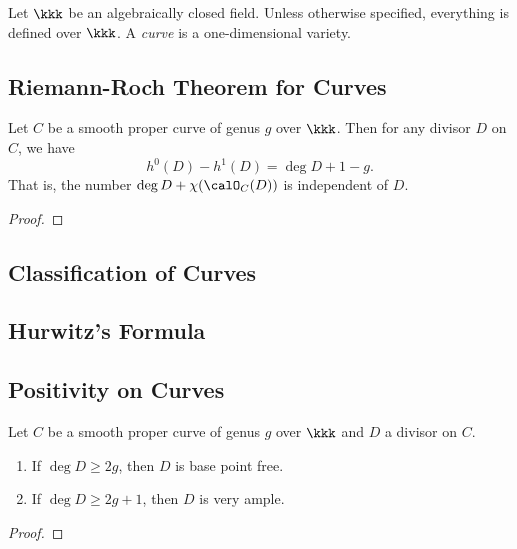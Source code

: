 Let \(\kkk\) be an algebraically closed field. 
Unless otherwise specified, everything is defined over \(\kkk\).
A \emph{curve} is a one-dimensional variety.

\subsection{Riemann-Roch Theorem for Curves}

    \begin{theorem}\label{thm:Riemann-Roch_Theorem_for_Curves}
        Let \(C\) be a smooth proper curve of genus \(g\) over \(\kkk\).
        Then for any divisor \(D\) on \(C\), we have
        \[ h^0(D) - h^1(D) = \deg D + 1 - g. \]
        That is, the number \(\deg D + \chi(\calO_C(D))\) is independent of \(D\).
    \end{theorem}
    \begin{proof}
    \end{proof}

\subsection{Classification of Curves}


\subsection{Hurwitz's Formula}

    \begin{theorem}\label{thm:Hurwitz_Formula}
    \end{theorem}


\subsection{Positivity on Curves}

    \begin{theorem}\label{thm:bpf_and_very_ample_divisor_on_curve}
        Let \(C\) be a smooth proper curve of genus \(g\) over \(\kkk\) and \(D\) a divisor on \(C\).
        \begin{enumerate}
            \item If \(\deg D \geq 2g\), then \(D\) is base point free.
            \item If \(\deg D \geq 2g + 1\), then \(D\) is very ample.
        \end{enumerate}
    \end{theorem}
    \begin{proof}
    \end{proof}
